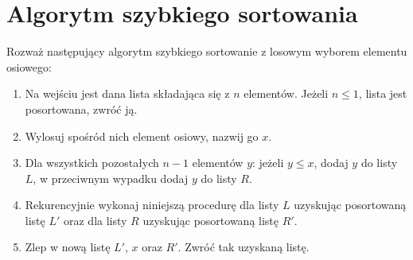 \documentclass{mwart}
\begin{document}
\clearpage

\section{Algorytm szybkiego sortowania}
Rozważ następujący algorytm szybkiego sortowanie z losowym wyborem elementu osiowego:
\begin{enumerate}
\item Na wejściu jest dana lista składająca się z $n$ elementów. Jeżeli $n\leq 1$, lista jest posortowana, zwróć ją.
\item Wylosuj spośród nich element osiowy, nazwij go $x$.
\item Dla wszystkich pozostałych $n-1$ elementów $y$: jeżeli $y\leq x$, dodaj $y$ do listy $L$, w przeciwnym wypadku dodaj $y$ do listy $R$.
\item Rekurencyjnie wykonaj niniejszą procedurę dla listy $L$ uzyskując posortowaną listę $L'$ oraz dla listy $R$ uzyskując posortowaną listę $R'$.
\item Zlep w nową listę $L'$, $x$ oraz $R'$. Zwróć tak uzyskaną listę.
\end{enumerate}
\end{document}
